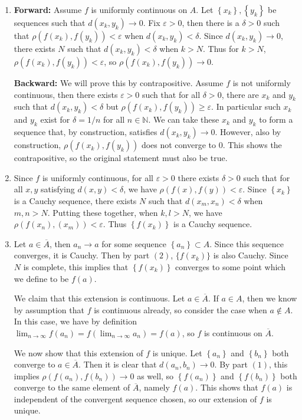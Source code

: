 \documentclass[10pt]{amsart}
\begin{document}
\begin{enumerate}
	\item \textbf{Forward:} Assume $f$ is uniformly continuous on $A$. Let $\left\{ x_k \right\}, \left\{ y_k \right\}$ be sequences such that $d(x_k,y_k) \to 0$. Fix $\varepsilon>0$, then there is a $\delta>0$ such that $\rho(f(x_k),f(y_k)) < \varepsilon$ when $d(x_k,y_k) < \delta$. Since $d(x_k,y_k) \to 0$, there exists $N$ such that $d(x_k,y_k) < \delta$ when $k > N$. Thus for $k > N$, $\rho(f(x_k),f(y_k)) < \varepsilon$, so $\rho(f(x_k),f(y_k)) \to 0$.

		\textbf{Backward:} We will prove this by contrapositive. Assume $f$ is not uniformly continuous, then there exists $\varepsilon>0$ such that for all $\delta>0$, there are $x_k$ and $y_k$ such that $d(x_k,y_k)<\delta$ but $\rho(f(x_k),f(y_k)) \geq \varepsilon$. In particular such $x_k$ and $y_k$ exist for $\delta=1/n$ for all $n \in \mathbb{N}$. We can take these $x_k$ and $y_k$ to form a sequence that, by construction, satisfies $d(x_k, y_k) \to 0$. However, also by construction, $\rho(f(x_k),f(y_k))$ does not converge to $0$. This shows the contrapositive, so the original statement must also be true.

	\item Since $f$ is uniformly continuous, for all $\varepsilon>0$ there exists $\delta>0$ such that for all $x,y$ satisfying $d(x,y) < \delta$, we have $\rho(f(x),f(y)) < \varepsilon$. Since $\left\{ x_k \right\}$ is a Cauchy sequence, there exists $N$ such that $d(x_m,x_n)<\delta$ when $m,n > N$. Putting these together, when $k,l>N$, we have $\rho(f(x_n),(x_m)) < \varepsilon$. Thus $\left\{ f(x_k) \right\}$ is a Cauchy sequence.
	
	\item Let $a \in \overline{A}$, then $a_n \to a$ for some sequence $\left\{ a_n \right\}\subset A$. Since this sequence converges, it is Cauchy. Then by part $(2)$, $\{f(x_k)\}$ is also Cauchy. Since $N$ is complete, this implies that $\left\{ f(x_k) \right\}$ converges to some point which we define to be $f(a)$.

		We claim that this extension is continuous. Let $a \in \overline{A}$. If $a \in A$, then we know by assumption that $f$ is continuous already, so consider the case when $a \not\in A$. In this case, we have by definition $\lim_{n \to \infty} f(a_n) = f(\lim_{n \to \infty} a_n) = f(a)$, so $f$ is continuous on $\overline{A}$.

		We now show that this extension of $f$ is unique. Let $\left\{ a_n \right\}$ and $\left\{ b_n \right\}$ both converge to $a \in \overline{A}$. Then it is clear that $d(a_n,b_n) \to 0$. By part $(1)$, this implies $\rho(f(a_n),f(b_n)) \to 0$ as well, so $\left\{ f(a_n) \right\}$ and $\left\{ f(b_n) \right\}$ both converge to the same element of $\overline{A}$, namely $f(a)$. This shows that $f(a)$ is independent of the convergent sequence chosen, so our extension of $f$ is unique.
\end{enumerate}
\end{document}
